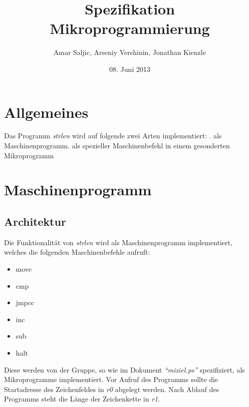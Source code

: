 \documentclass[12pt,a4paper]{article}
\title{Spezifikation Mikroprogrammierung}
\author{Amar Saljic, Arseniy Vershinin, Jonathan Kienzle}
\date{08. Juni 2013}
\begin{document}
\maketitle

\thispagestyle{fancy}

\section*{Allgemeines}

Das Programm \textit{strlen} wird auf folgende zwei Arten implementiert: . als Maschinenprogramm. als spezieller Maschinenbefehl in einem gesonderten Mikroprogramm \newline 

\section{Maschinenprogramm}

\subsection{Architektur}
Die Funktionalität von \textit{strlen} wird als Maschinenprogramm implementiert, welches die folgenden Maschinenbefehle aufruft: 

\begin{itemize}
\item move
\item cmp
\item jmpcc
\item inc
\item sub
\item halt
\end{itemize}
Diese werden von der Gruppe, so wie im Dokument \emph{``miziel.ps''} spezifiziert, als Mikroprogramme implementiert. Vor Aufruf des Programms sollte die Startadresse des Zeichenfeldes in \textit{r0} abgelegt werden. Nach Ablauf des Programms steht die Länge der Zeichenkette in \textit{r1}. 
\end{document}
